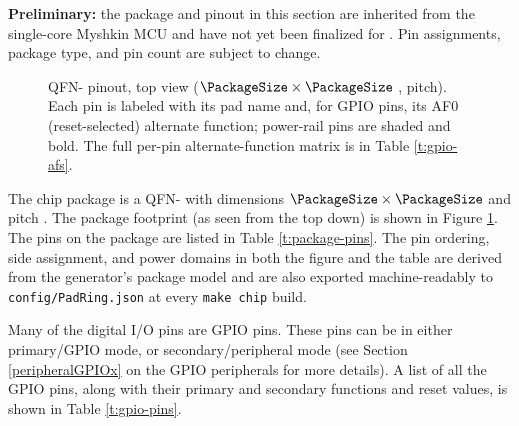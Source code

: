 \documentclass[11pt,pdftex,portrait,letterpaper]{article}
\begin{document}
\ifpackagepreliminary
\textbf{Preliminary:} the package and pinout in this section are inherited from the single-core Myshkin MCU and have not yet been finalized for \AsicNameForUserGuide. Pin assignments, package type, and pin count are subject to change.
\fi

\begin{figure}[h]
	\centering
	\resizebox{0.98\linewidth}{!}{}
	\caption{QFN-{\PackagePinCount} pinout, top view ($\PackageSize \times \PackageSize$ {\PackageUnits}, {\PackagePinPitch} {\PackageUnits} pitch). Each pin is labeled with its pad name and, for GPIO pins, its AF0 (reset-selected) alternate function; power-rail pins are shaded and bold. The full per-pin alternate-function matrix is in Table \ref{t:gpio-afs}.}
	\label{fig:package}
\end{figure}

The chip package is a QFN-{\PackagePinCount} with dimensions $\PackageSize \times \PackageSize$ {\PackageUnits} and pitch {\PackagePinPitch} {\PackageUnits}. The package footprint (as seen from the top down) is shown in Figure \ref{fig:package}. The pins on the package are listed in Table \ref{t:package-pins}. The pin ordering, side assignment, and power domains in both the figure and the table are derived from the generator's package model and are also exported machine-readably to \texttt{config/PadRing.json} at every \texttt{make chip} build.



Many of the digital I/O pins are GPIO pins. These pins can be in either primary/GPIO mode, or secondary/peripheral mode (see Section \ref{peripheralGPIOx} on the GPIO peripherals for more details). A list of all the GPIO pins, along with their primary and secondary functions and reset values, is shown in Table \ref{t:gpio-pins}.


\end{document}
